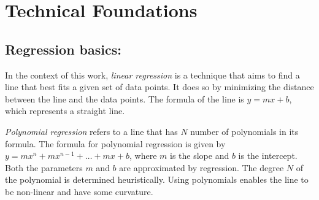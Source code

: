 \section{Technical Foundations}

\subsection{Regression basics:}

 In the context of this work, \textit{linear regression} is a technique that aims to find a line that best fits a given set of data points. It does so by minimizing the distance between the line and the data points. The formula of the line is $y = mx + b$, which represents a straight line.

\textit{Polynomial regression} refers to a line that has $N$ number of polynomials in its formula. The formula for polynomial regression is given by $y = mx^n + mx^{n-1} + \ldots + mx + b$, where $m$ is the slope and $b$ is the intercept. Both the parameters $m$ and $b$ are approximated by regression. The degree $N$ of the polynomial is determined heuristically. Using polynomials enables the line to be non-linear and have some curvature.
